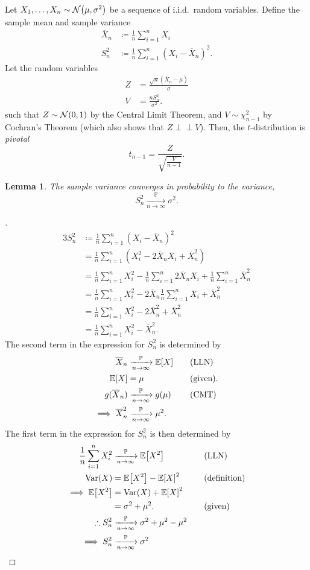 \documentclass[letterpaper, reqno]{amsart}
\newtheorem{lemma}[theorem]{Lemma}
\renewcommand{\qedsymbol}{\ensuremath{\blacksquare}}
\newenvironment{subproof}[1][\proofname]{%
  \renewcommand{\qedsymbol}{\ensuremath{\square}}%
  \begin{proof}[#1]%
}{%
  \end{proof}%
}
\numberwithin{equation}{section}
\newcommand{\ddfrac}[2]{\frac{\displaystyle #1}{\displaystyle #2}}
\newcommand{\E}[1]{\mathbb{E}\mleft[#1\mright]}
\newcommand{\Var}[1]{\operatorname{Var}\mleft(#1\mright)}
\newcommand{\N}[2]{\mathcal{N}\mleft( #1, #2 \mright)}
\newcommand{\indep}{\perp \!\!\! \perp}  %
\newcommand{\iid}{i.i.d.}
\newcommand{\sumi}[2]{\sum_{#1=1}^{#2}}
\newcommand{\avg}[2]{\frac{1}{#2}\sumi{#1}{#2}}
\newcommand{\by}[1]{&\quad&\text{(#1)}}
\newcommand{\Plim}{\xrightarrow[n \to \infty]{\mathbb{P}}}
\newcommand{\Xnbar}{\overline{X}_n}
\begin{document}
Let $X_1, \dots, X_n \sim \N{\mu}{\sigma^2}$ be a sequence of \iid\ random
variables. Define the sample mean and sample variance
\begin{align*}
  \Xnbar &\coloneqq \avg{i}{n} X_i \\
  S_n^2 &\coloneqq \avg{i}{n} (X_i - \Xnbar)^2.
\end{align*}
Let the random variables
\begin{align*}
  Z &= \frac{\sqrt{n}(\Xnbar - \mu)}{\sigma} \\
  V &= \frac{n S_n^2}{\sigma^2}.
\end{align*}
such that $Z \sim \N{0}{1}$ by the Central Limit Theorem, and $V \sim
\chi^2_{n-1}$ by Cochran's Theorem (which also shows that $Z \indep V$).
Then, the $t$-distribution is \emph{pivotal}
\[  t_{n-1} = \ddfrac{Z}{\sqrt{\frac{V}{n-1}}}. \]

\begin{lemma}
  The sample variance converges in probability to the variance,
  \[ S_n^2 \Plim \sigma^2. \]
\end{lemma}

\begin{subproof}
  \begin{alignat*}{3}
    S_n^2 &\coloneqq \avg{i}{n}(X_i - \Xnbar)^2 \\
          &= \avg{i}{n}(X_i^2 - 2 \Xnbar X_i + \Xnbar^2) \\
          &= \avg{i}{n} X_i^2 - \avg{i}{n} 2 \Xnbar X_i + \avg{i}{n} \Xnbar^2  \\
          &= \avg{i}{n} X_i^2 - 2 \Xnbar \avg{i}{n} X_i + \Xnbar^2  \\
          &= \avg{i}{n} X_i^2 - 2 \Xnbar^2  + \Xnbar^2  \\
          &= \avg{i}{n} X_i^2 - \Xnbar^2.
  \end{alignat*}
  The second term in the expression for $S_n^2$ is determined by
  \begin{alignat*}{3}
    \Xnbar &\Plim \E{X} \by{LLN} \\
    \E{X} &= \mu \by{given}. \\
    g(\Xnbar) &\Plim g(\mu) \by{CMT} \\
    \implies \Xnbar^2 &\Plim \mu^2.
  \end{alignat*}
  The first term in the expression for $S_n^2$ is then determined by
  \begin{alignat*}{3}
    \avg{i}{n} X_i^2 &\Plim \E{X^2} \by{LLN} \\
    \Var{X} &= \E{X^2} - \E{X}^2 \by{definition} \\
    \implies \E{X^2} &= \Var{X} + \E{X}^2 \\
                     &= \sigma^2 + \mu^2. \by{given} \\
    \therefore S_n^2 &\Plim \sigma^2 + \mu^2 - \mu^2 \\
    \implies S_n^2 &\Plim \sigma^2 \tag*{\qedhere}
  \end{alignat*}
\end{subproof}
\end{document}
